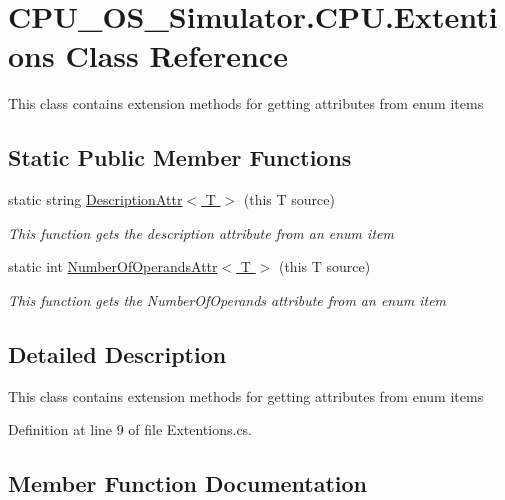 \hypertarget{class_c_p_u___o_s___simulator_1_1_c_p_u_1_1_extentions}{}\section{C\+P\+U\+\_\+\+O\+S\+\_\+\+Simulator.\+C\+P\+U.\+Extentions Class Reference}
\label{class_c_p_u___o_s___simulator_1_1_c_p_u_1_1_extentions}


This class contains extension methods for getting attributes from enum items  


\subsection*{Static Public Member Functions}
\begin{DoxyCompactItemize}
\item 
static string \hyperlink{class_c_p_u___o_s___simulator_1_1_c_p_u_1_1_extentions_a57b9eeabb06f5b69160698e7106b2193}{Description\+Attr$<$ T $>$} (this T source)
\begin{DoxyCompactList}\small\item\em This function gets the description attribute from an enum item \end{DoxyCompactList}\item 
static int \hyperlink{class_c_p_u___o_s___simulator_1_1_c_p_u_1_1_extentions_a5391dde3088335a6e3754e1273f0ff40}{Number\+Of\+Operands\+Attr$<$ T $>$} (this T source)
\begin{DoxyCompactList}\small\item\em This function gets the Number\+Of\+Operands attribute from an enum item \end{DoxyCompactList}\end{DoxyCompactItemize}


\subsection{Detailed Description}
This class contains extension methods for getting attributes from enum items 



Definition at line 9 of file Extentions.\+cs.



\subsection{Member Function Documentation}
\hypertarget{class_c_p_u___o_s___simulator_1_1_c_p_u_1_1_extentions_a57b9eeabb06f5b69160698e7106b2193}{}
